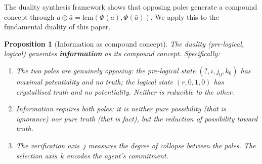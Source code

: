 \documentclass[11pt,a4paper]{article}
\newtheorem{proposition}[theorem]{Proposition}
\begin{document}
The duality synthesis framework \citep{p12} shows that opposing poles
generate a compound concept through
$a \oplus \bar{a} = \mathrm{lcm}(\Phi(a), \Phi(\bar{a}))$. We apply
this to the fundamental duality of this paper.

\begin{proposition}[Information as compound concept]
\label{thm:information}
The duality (pre-logical, logical) generates \textbf{information} as its
compound concept. Specifically:
\begin{enumerate}[nosep]
\item The two poles are genuinely opposing: the pre-logical state
  $(?, i, j_0, k_0)$ has maximal potentiality and no truth; the logical
  state $(r, 0, 1, 0)$ has crystallised truth and no potentiality.
  Neither is reducible to the other.
\item Information requires \emph{both} poles: it is neither pure
  possibility (that is ignorance) nor pure truth (that is fact), but
  the \emph{reduction} of possibility \emph{toward} truth.
\item The verification axis~$j$ measures the degree of collapse between
  the poles. The selection axis~$k$ encodes the agent's commitment.
\end{enumerate}
\end{proposition}
\end{document}
